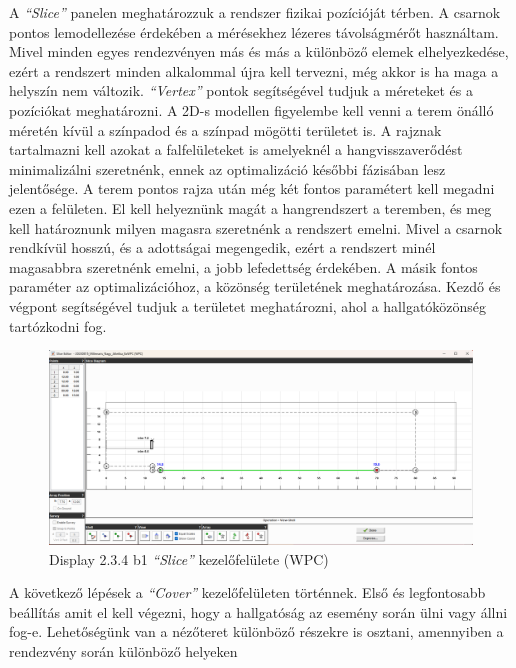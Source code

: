 A \textit{``Slice''} panelen meghatározzuk a rendszer fizikai pozícióját térben. A csarnok
pontos lemodellezése érdekében a mérésekhez lézeres távolságmérőt használtam.
Mivel minden egyes rendezvényen más és más a különböző elemek elhelyezkedése, ezért a
rendszert minden alkalommal újra kell tervezni, még akkor is ha maga a helyszín nem változik.
\textit{``Vertex''} pontok segítségével tudjuk a méreteket és a pozíciókat meghatározni.
A 2D-s modellen figyelembe kell venni a terem önálló méretén kívül a színpadod és a színpad mögötti területet is.
A rajznak tartalmazni kell azokat a falfelületeket is amelyeknél a hangvisszaverődést minimalizálni szeretnénk,
ennek az optimalizáció későbbi fázisában lesz jelentősége.
A terem pontos rajza után még két fontos paramétert kell megadni ezen a felületen.
El kell helyeznünk magát a hangrendszert a teremben, és meg kell határoznunk milyen magasra szeretnénk a rendszert emelni.
Mivel a csarnok rendkívül hosszú, és a adottságai megengedik, ezért a rendszert minél magasabbra szeretnénk emelni,
a jobb lefedettség érdekében.
A másik fontos paraméter az optimalizációhoz, a közönség területének meghatározása. Kezdő és végpont segítségével
tudjuk a területet meghatározni, ahol a hallgatóközönség tartózkodni fog.
\begin{figure}[H]
	\centering
	\includegraphics[width=\textwidth, keepaspectratio]{figures/display_wpc_1.png}
	\caption{Display 2.3.4 b1 \textit{``Slice''} kezelőfelülete (WPC)}\label{fig:display_wpc_1}
\end{figure}
A következő lépések a \textit{``Cover''} kezelőfelületen történnek.
Első és legfontosabb beállítás amit el kell végezni, hogy a hallgatóság az esemény során ülni vagy állni fog-e.
Lehetőségünk van a nézőteret különböző részekre is osztani, amennyiben a rendezvény során különböző helyeken
